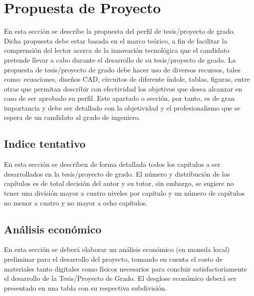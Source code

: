 \chapter{Propuesta de Proyecto}
\label{sec:practico}


En esta sección se describe la propuesta del perfil de tesis/proyecto de grado. Dicha propuesta debe estar basada en el marco teórico, a fin de facilitar la comprensión del lector acerca de la innovación tecnológica que el candidato pretende llevar a cabo durante el desarrollo de su tesis/proyecto de grado.
La propuesta de tesis/proyecto de grado debe hacer uso de diversos recursos, tales como: ecuaciones, diseños CAD, circuitos de diferente índole, tablas, figuras, entre otras que permitan describir con efectividad los objetivos que desea alcanzar en caso de ser aprobado su perfil.
Este apartado o sección, por tanto, es de gran importancia y debe ser detallado con la objetividad y el profesionalismo que se espera de un candidato al grado de ingeniero.

\section{Indice tentativo}
En esta sección se describen de forma detallada todos los capítulos a ser desarrollados en la tesis/proyecto de grado. El número y distribución de los capítulos es de total decisión del autor y su tutor, sin embargo, se sugiere no tener una división mayor a cuatro niveles por capítulo y un número de capítulos no menor a cuatro y no mayor a ocho capítulos.

\section{Análisis económico}
En esta sección se deberá elaborar un análisis económico (en moneda local) preliminar para el desarrollo del proyecto, tomando en cuenta el costo de materiales tanto digitales como físicos necesarios para concluir satisfactoriamente el desarrollo de la Tesis/Proyecto de Grado. 
El desglose económico deberá ser presentado en una tabla con su respectiva subdivisión.

